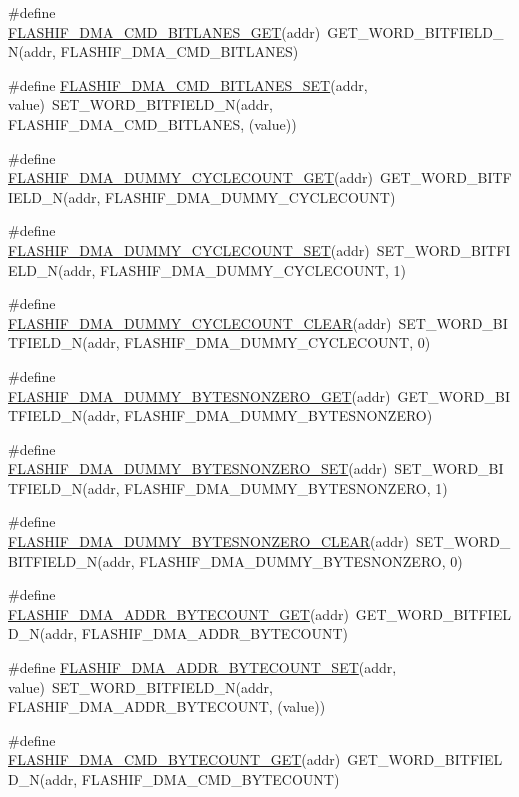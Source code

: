 \begin{DoxyCompactItemize}
\item 
\#define \hyperlink{a00551_a25961fd4dd39ebdf84bc78a930ce84f6}{FLASHIF\_\-DMA\_\-CMD\_\-BITLANES\_\-GET}(addr)~GET\_\-WORD\_\-BITFIELD\_\-N(addr, FLASHIF\_\-DMA\_\-CMD\_\-BITLANES)
\item 
\#define \hyperlink{a00551_a0de2ef8b744564011838dcc5b513d8be}{FLASHIF\_\-DMA\_\-CMD\_\-BITLANES\_\-SET}(addr, value)~SET\_\-WORD\_\-BITFIELD\_\-N(addr, FLASHIF\_\-DMA\_\-CMD\_\-BITLANES, (value))
\item 
\#define \hyperlink{a00551_a55d674cb28fb8ae851d2fcd41c7cade6}{FLASHIF\_\-DMA\_\-DUMMY\_\-CYCLECOUNT\_\-GET}(addr)~GET\_\-WORD\_\-BITFIELD\_\-N(addr, FLASHIF\_\-DMA\_\-DUMMY\_\-CYCLECOUNT)
\item 
\#define \hyperlink{a00551_a23c4b3360b25e2abfd5158e4429e9dd1}{FLASHIF\_\-DMA\_\-DUMMY\_\-CYCLECOUNT\_\-SET}(addr)~SET\_\-WORD\_\-BITFIELD\_\-N(addr, FLASHIF\_\-DMA\_\-DUMMY\_\-CYCLECOUNT, 1)
\item 
\#define \hyperlink{a00551_a98bd11ab6b5bb37befca8246dcda28be}{FLASHIF\_\-DMA\_\-DUMMY\_\-CYCLECOUNT\_\-CLEAR}(addr)~SET\_\-WORD\_\-BITFIELD\_\-N(addr, FLASHIF\_\-DMA\_\-DUMMY\_\-CYCLECOUNT, 0)
\item 
\#define \hyperlink{a00551_a4592db1bfa5a6ba819080061af1b006c}{FLASHIF\_\-DMA\_\-DUMMY\_\-BYTESNONZERO\_\-GET}(addr)~GET\_\-WORD\_\-BITFIELD\_\-N(addr, FLASHIF\_\-DMA\_\-DUMMY\_\-BYTESNONZERO)
\item 
\#define \hyperlink{a00551_aed783df036966fae226562661baf0fde}{FLASHIF\_\-DMA\_\-DUMMY\_\-BYTESNONZERO\_\-SET}(addr)~SET\_\-WORD\_\-BITFIELD\_\-N(addr, FLASHIF\_\-DMA\_\-DUMMY\_\-BYTESNONZERO, 1)
\item 
\#define \hyperlink{a00551_afe9f6f36ddbbb70efaeeb6d27acea0ba}{FLASHIF\_\-DMA\_\-DUMMY\_\-BYTESNONZERO\_\-CLEAR}(addr)~SET\_\-WORD\_\-BITFIELD\_\-N(addr, FLASHIF\_\-DMA\_\-DUMMY\_\-BYTESNONZERO, 0)
\item 
\#define \hyperlink{a00551_aa0dde89d127aa02da5c62e26d8a92f8c}{FLASHIF\_\-DMA\_\-ADDR\_\-BYTECOUNT\_\-GET}(addr)~GET\_\-WORD\_\-BITFIELD\_\-N(addr, FLASHIF\_\-DMA\_\-ADDR\_\-BYTECOUNT)
\item 
\#define \hyperlink{a00551_a8d77750fcd9bdf21646595739fe32d87}{FLASHIF\_\-DMA\_\-ADDR\_\-BYTECOUNT\_\-SET}(addr, value)~SET\_\-WORD\_\-BITFIELD\_\-N(addr, FLASHIF\_\-DMA\_\-ADDR\_\-BYTECOUNT, (value))
\item 
\#define \hyperlink{a00551_ab8ff6863a8f6bdf4d3497ca79a68b50c}{FLASHIF\_\-DMA\_\-CMD\_\-BYTECOUNT\_\-GET}(addr)~GET\_\-WORD\_\-BITFIELD\_\-N(addr, FLASHIF\_\-DMA\_\-CMD\_\-BYTECOUNT)

\end{DoxyCompactItemize}
